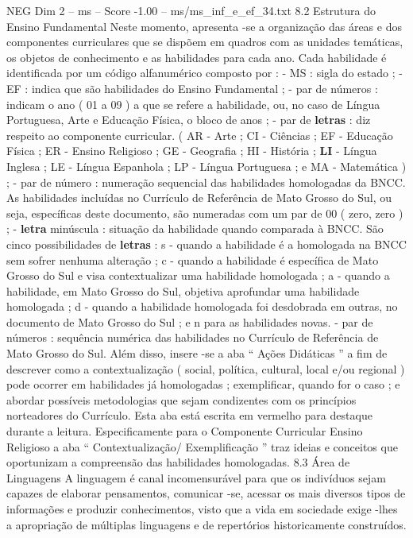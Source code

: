 \begin{textsample}{NEG Dim 2 – ms – Score -1.00 – ms/ms\_inf\_e\_ef\_34.txt}  \label{ex:f2_neg_242}
8.2 Estrutura do Ensino Fundamental Neste momento, apresenta -se a organização das áreas e dos componentes curriculares que se dispõem em quadros com as unidades temáticas, os objetos de conhecimento e as habilidades para cada ano.
Cada habilidade é identificada por um código alfanumérico composto por : - MS : sigla do estado ; - EF : indica que são habilidades do Ensino Fundamental ; - par de números : indicam o ano ( 01 a 09 ) a que se refere a habilidade, ou, no caso de Língua Portuguesa, Arte e Educação Física, o bloco de anos ; - par de \textbf{letras} : diz respeito ao componente curricular. ( AR - Arte ; CI - Ciências ; EF - Educação Física ; ER - Ensino Religioso ; GE - Geografia ; HI - História ; \textbf{LI} - Língua Inglesa ; LE - Língua Espanhola ; LP - Língua Portuguesa ; e MA - Matemática ) ; - par de número : numeração sequencial das habilidades homologadas da BNCC.
As habilidades incluídas no Currículo de Referência de Mato Grosso do Sul, ou seja, específicas deste documento, são numeradas com um par de 00 ( zero, zero ) ; - \textbf{letra} minúscula : situação da habilidade quando comparada à BNCC.
São cinco possibilidades de \textbf{letras} : s - quando a habilidade é a homologada na BNCC sem sofrer nenhuma alteração ; c - quando a habilidade é específica de Mato Grosso do Sul e visa contextualizar uma habilidade homologada ; a - quando a habilidade, em Mato Grosso do Sul, objetiva aprofundar uma habilidade homologada ; d - quando a habilidade homologada foi desdobrada em outras, no documento de Mato Grosso do Sul ; e n para as habilidades novas. - par de números : sequência numérica das habilidades no Currículo de Referência de Mato Grosso do Sul.
Além disso, insere -se a aba “ Ações Didáticas ” a fim de descrever como a contextualização ( social, política, cultural, local e/ou regional ) pode ocorrer em habilidades já homologadas ; exemplificar, quando for o caso ; e abordar possíveis metodologias que sejam condizentes com os princípios norteadores do Currículo.
Esta aba está escrita em vermelho para destaque durante a leitura.
Especificamente para o Componente Curricular Ensino Religioso a aba “ Contextualização/ Exemplificação ” traz ideias e conceitos que oportunizam a compreensão das habilidades homologadas. 8.3 Área de Linguagens A linguagem é canal incomensurável para que os indivíduos sejam capazes de elaborar pensamentos, comunicar -se, acessar os mais diversos tipos de informações e produzir conhecimentos, visto que a vida em sociedade exige -lhes a apropriação de múltiplas linguagens e de repertórios historicamente construídos.

\end{textsample}
